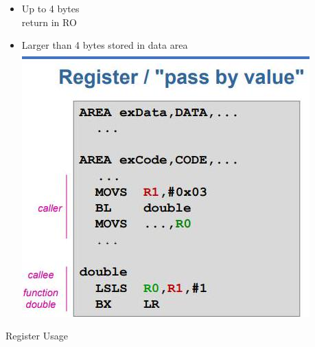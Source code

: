 \documentclass[10pt]{article}
\begin{document}
\begin{itemize}
  \item Up to 4 bytes\\
return in RO
  \item Larger than 4 bytes stored in data area\\
\includegraphics[max width=\textwidth, center]{2024_12_29_79e6b22f503fb7b4f718g-09(2)}
\end{itemize}

Register Usage
\end{document}

